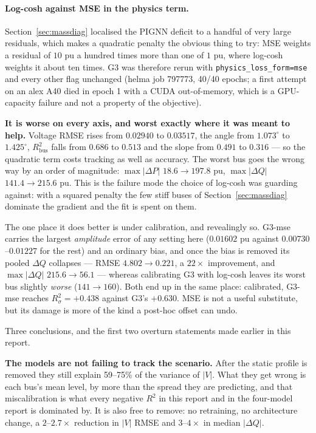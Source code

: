 \documentclass[10pt]{article}
\begin{document}
\paragraph{Log-cosh against MSE in the physics term.}  Section~\ref{sec:massdiag}
localised the PIGNN deficit to a handful of very large residuals, which makes a
quadratic penalty the obvious thing to try: MSE weights a residual of $10$ pu a
hundred times more than one of $1$ pu, where log-cosh weights it about ten
times.  G3 was therefore rerun with \texttt{physics\_loss\_form=mse} and every
other flag unchanged (helma job 797773, 40/40 epochs; a first attempt on an
alex A40 died in epoch 1 with a CUDA out-of-memory, which is a GPU-capacity
failure and not a property of the objective).

\textbf{It is worse on every axis, and worst exactly where it was meant to
help.}  Voltage RMSE rises from $0.02940$ to $0.03517$, the angle from
$1.073^\circ$ to $1.425^\circ$, $R^2_{\mathrm{bus}}$ falls from $0.686$ to
$0.513$ and the slope from $0.491$ to $0.316$ --- so the quadratic term costs
tracking as well as accuracy.  The worst bus goes the wrong way by an order of
magnitude: $\max|\Delta P|$ $18.6 \to 197.8$ pu, $\max|\Delta Q|$
$141.4 \to 215.6$ pu.  This is the failure mode the choice of log-cosh was
guarding against: with a squared penalty the few stiff buses of
Section~\ref{sec:massdiag} dominate the gradient and the fit is spent on them.

The one place it does better is under calibration, and revealingly so.  G3-mse
carries the largest \emph{amplitude} error of any setting here ($0.01602$ pu
against $0.00730$--$0.01227$ for the rest) and an ordinary bias, and once the
bias is removed its pooled $\Delta Q$ collapses --- RMSE $4.802 \to 0.221$, a
$22\times$ improvement, and $\max|\Delta Q|$ $215.6 \to 56.1$ --- whereas
calibrating G3 with log-cosh leaves its worst bus slightly \emph{worse}
($141 \to 160$).  Both end up in the same place: calibrated, G3-mse reaches
$R^2_{\sigma} = +0.438$ against G3's $+0.630$.  MSE is not a useful
substitute, but its damage is more of the kind a post-hoc offset can undo.

Three conclusions, and the first two overturn statements made earlier in this
report.

\textbf{The models are not failing to track the scenario.}  After the static
profile is removed they still explain 59--75\% of the variance of $|V|$.  What
they get wrong is each bus's mean level, by more than the spread they are
predicting, and that miscalibration is what every negative $R^2$ in this report
and in the four-model report is dominated by.  It is also free to remove: no
retraining, no architecture change, a $2$--$2.7\times$ reduction in $|V|$ RMSE
and $3$--$4\times$ in median $|\Delta Q|$.
\end{document}

